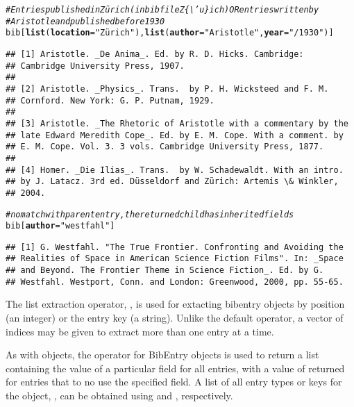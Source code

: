 \documentclass[article]{jss}\usepackage[]{graphicx}\usepackage[]{color}
\makeatletter
\newcommand{\hlstr}[1]{\textcolor[rgb]{0.125,0.125,1}{#1}}%
\newcommand{\hlcom}[1]{\textcolor[rgb]{1,0,0.753}{\textit{#1}}}%
\newcommand{\hlstd}[1]{\textcolor[rgb]{0.251,0.251,0.282}{#1}}%
\newcommand{\hlkwc}[1]{\textcolor[rgb]{0.529,0,0.184}{\textbf{#1}}}%
\newcommand{\hlkwd}[1]{\textcolor[rgb]{0.251,0.251,0.282}{\textbf{#1}}}%
\newenvironment{kframe}{%
 \def\at@end@of@kframe{}%
 \ifinner\ifhmode%
  \def\at@end@of@kframe{\end{minipage}}%
  \begin{minipage}{\columnwidth}%
 \fi\fi%
 \def\FrameCommand##1{\hskip\@totalleftmargin \hskip-\fboxsep
 \colorbox{shadecolor}{##1}\hskip-\fboxsep
     \hskip-\linewidth \hskip-\@totalleftmargin \hskip\columnwidth}%
 \MakeFramed {\advance\hsize-\width
   \@totalleftmargin\z@ \linewidth\hsize
   \@setminipage}}%
 {\par\unskip\endMakeFramed%
 \at@end@of@kframe}
\newenvironment{knitrout}{}{} %
\newcommand{\bt}{\`{}}
\makeatother
\begin{document}
\begin{knitrout}
\color{fgcolor}\begin{kframe}
\begin{alltt}
\hlcom{# Entries published in Zürich (in bib file Z\{\textbackslash{}'u\}ich) OR entries written by}
\hlcom{# Aristotle and published before 1930}
\hlstd{bib[}\hlkwd{list}\hlstd{(}\hlkwc{location} \hlstd{=} \hlstr{"Zürich"}\hlstd{),} \hlkwd{list}\hlstd{(}\hlkwc{author} \hlstd{=} \hlstr{"Aristotle"}\hlstd{,} \hlkwc{year} \hlstd{=} \hlstr{"/1930"}\hlstd{)]}
\end{alltt}
\begin{verbatim}
## [1] Aristotle. _De Anima_. Ed. by R. D. Hicks. Cambridge:
## Cambridge University Press, 1907.
## 
## [2] Aristotle. _Physics_. Trans.  by P. H. Wicksteed and F. M.
## Cornford. New York: G. P. Putnam, 1929.
## 
## [3] Aristotle. _The Rhetoric of Aristotle with a commentary by the
## late Edward Meredith Cope_. Ed. by E. M. Cope. With a comment. by
## E. M. Cope. Vol. 3. 3 vols. Cambridge University Press, 1877.
## 
## [4] Homer. _Die Ilias_. Trans.  by W. Schadewaldt. With an intro.
## by J. Latacz. 3rd ed. Düsseldorf and Zürich: Artemis \& Winkler,
## 2004.
\end{verbatim}
\begin{alltt}
\hlcom{# no match with parent entry, the returned child has inherited fields}
\hlstd{bib[}\hlkwc{author} \hlstd{=} \hlstr{"westfahl"}\hlstd{]}
\end{alltt}
\begin{verbatim}
## [1] G. Westfahl. "The True Frontier. Confronting and Avoiding the
## Realities of Space in American Science Fiction Films". In: _Space
## and Beyond. The Frontier Theme in Science Fiction_. Ed. by G.
## Westfahl. Westport, Conn. and London: Greenwood, 2000, pp. 55-65.
\end{verbatim}
\end{kframe}
\end{knitrout}

The list extraction operator, \code{\bt[[\bt}, is used for extacting bibentry objects by position (an integer) or the entry key (a string).  Unlike the default operator, a vector of indices may be given to extract more than one entry at a time.

As with  objects, the \code{\bt$\bt} operator for BibEntry objects is used to return a list containing the value of a particular field for all entries, with a value of  returned for entries that to no use the specified field.  A list of all entry types or keys for the  object, , can be obtained using  and , respectively.
\end{document}
